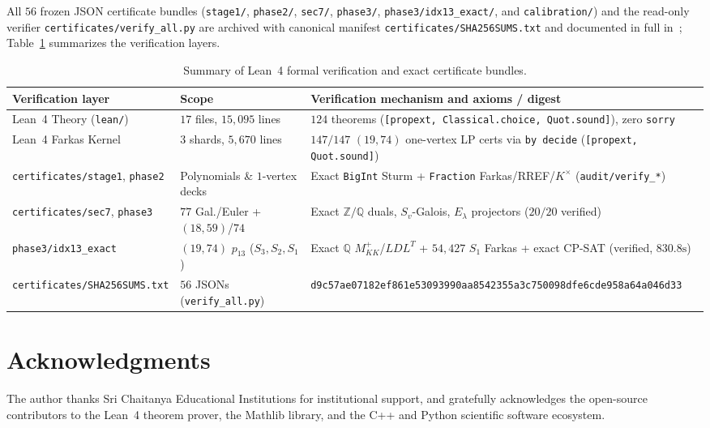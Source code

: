 \documentclass[11pt,reqno]{amsart}
\theoremstyle{definition}
\theoremstyle{remark}
\begin{document}
All $56$ frozen JSON certificate bundles (\nolinkurl{stage1/}, \nolinkurl{phase2/}, \nolinkurl{sec7/}, \nolinkurl{phase3/}, \nolinkurl{phase3/idx13_exact/}, and \nolinkurl{calibration/}) and the read-only verifier \nolinkurl{certificates/verify_all.py} are archived with canonical manifest \nolinkurl{certificates/SHA256SUMS.txt} and documented in full in~\cite{CompanionFull}; Table~\ref{tab:artifacts} summarizes the verification layers.

\begin{table}[htbp]
\centering
\caption{Summary of Lean~4 formal verification and exact certificate bundles.}\label{tab:artifacts}
\scriptsize
\setlength{\tabcolsep}{3.5pt}
\begin{tabular}{@{}>{\raggedright\arraybackslash}p{1.45in}>{\raggedright\arraybackslash}p{1.2in}>{\raggedright\arraybackslash}p{3.2in}@{}}
\toprule
Verification layer & Scope & Verification mechanism and axioms / digest \\
\midrule
Lean~4 Theory (\texttt{lean/}) & $17$ files, $15{,}095$ lines & $124$ theorems (\texttt{[propext, Classical.choice, Quot.sound]}), zero \texttt{sorry} \\
Lean~4 Farkas Kernel & $3$ shards, $5{,}670$ lines & $147/147$ $(19,74)$ one-vertex LP certs via \texttt{by decide} (\texttt{[propext, Quot.sound]}) \\
\nolinkurl{certificates/stage1}, \nolinkurl{phase2} & Polynomials \& $1$-vertex decks & Exact \texttt{BigInt} Sturm + \texttt{Fraction} Farkas/RREF/$K^\times$ (\nolinkurl{audit/verify_*}) \\
\nolinkurl{certificates/sec7}, \nolinkurl{phase3} & $77$ Gal./Euler + $(18,59)$/$74$ & Exact $\mathbb{Z}/\mathbb{Q}$ duals, $S_v$-Galois, $E_\lambda$ projectors ($20/20$ verified) \\
\nolinkurl{phase3/idx13_exact} & $(19,74)$ $p_{13}$ ($S_3,S_2,S_1$) & Exact $\mathbb{Q}$ $M_{KK}^+$/$LDL^T$ + $54{,}427$ $S_1$ Farkas + exact CP-SAT (verified, $830.8\text{s}$) \\
\nolinkurl{certificates/SHA256SUMS.txt} & $56$ JSONs (\nolinkurl{verify_all.py}) & \texttt{d9c57ae07182ef861e53093990aa8542\allowbreak 355a3c750098dfe6cde958a64a046d33} \\
\bottomrule
\end{tabular}
\end{table}

\section*{Acknowledgments}
The author thanks Sri Chaitanya Educational Institutions for institutional support, and gratefully acknowledges the open-source contributors to the Lean~4 theorem prover, the Mathlib library, and the C++ and Python scientific software ecosystem.
\end{document}
